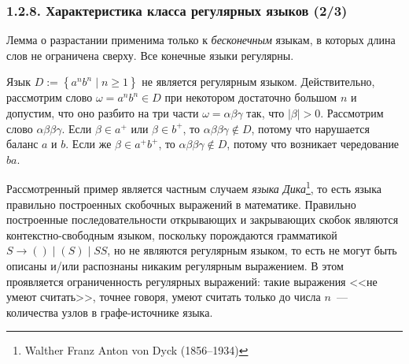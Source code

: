 \documentclass[mathserif,12pt,aspectratio=169]{beamer}
\def\emразделенной{\em разделенной}
\renewcommand{\index}[1]{}
\def\em#1{\it\color{blue}#1}
\def\odmkey#1#2{{\it\color{red} #1}\index{#2}}
\def\Set#1#2{\left\{ #1 \mid #2 \right\}}
\def\Assign{\operatorname{:=}}
\let\ge\geqslant
\begin{document}
\begin{frame}
\frametitle{1.2.8. Характеристика класса регулярных языков (2/3) }

\begin{remark}
Лемма о разрастании применима только к {\em бесконечным} языкам,
в которых длина слов не ограничена сверху.
Все конечные языки регулярны.   
\end{remark}

\begin{example}
Язык $D\Assign\Set{a^nb^n}{n\ge 1}$ не является регулярным языком.
Действительно, рассмотрим слово $\omega=a^nb^n \in D$ при некотором 
достаточно большом $n$
и допустим, что оно разбито на три части $\omega=\alpha\beta\gamma$ так,
что $|\beta|>0$. Рассмотрим слово $\alpha\beta\beta\gamma$.
Если $\beta\in a^+$ или $\beta\in b^+$, то
$\alpha\beta\beta\gamma\not\in D$, потому что нарушается баланс $a$ и $b$.
Если же $\beta\in a^+b^+$, то
$\alpha\beta\beta\gamma\not\in D$, потому что возникает чередование $ba$.
\end{example}

\begin{digress}
Рассмотренный пример является частным случаем 
\odmkey{языка Дика}{Язык!Дика}\footnote{Walther Franz Anton von Dyck (1856--1934)},
то есть языка правильно построенных скобочных выражений в математике.
Правильно построенные последовательности открывающих и закрывающих скобок
являются контекстно-свободным языком, поскольку порождаются грамматикой
$S\to ()\mid(S)\mid SS$, но не являются регулярным языком, то есть не могут быть 
описаны и/или распознаны никаким регулярным выражением.
В этом проявляется ограниченность регулярных выражений: такие выражения
<<не умеют считать>>, точнее говоря, умеют считать только до числа $n$~--- количества
узлов в графе-источнике языка.
\end{digress}
\end{frame}
\end{document}
